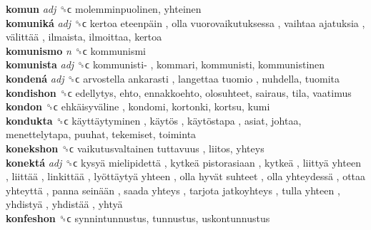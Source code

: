 \textbf{komun} \emph{adj}  ␝ϲ  molemminpuolinen, yhteinen  \\
\textbf{komuniká} \emph{adj}  ␝ϲ   kertoa eteenpäin ,  olla vuorovaikutuksessa ,  vaihtaa ajatuksia ,  välittää , ilmaista, ilmoittaa, kertoa  \\
\textbf{komunismo} \emph{n}  ␝ϲ  kommunismi  \\
\textbf{komunista} \emph{adj}  ␝ϲ   kommunisti- , kommari, kommunisti, kommunistinen  \\
\textbf{kondená} \emph{adj}  ␝ϲ   arvostella ankarasti ,  langettaa tuomio , nuhdella, tuomita  \\
\textbf{kondishon} ␝ϲ  edellytys, ehto, ennakkoehto, olosuhteet, sairaus, tila, vaatimus  \\
\textbf{kondon} ␝ϲ   ehkäisyväline , kondomi, kortonki, kortsu, kumi  \\
\textbf{kondukta} ␝ϲ   käyttäytyminen ,  käytös ,  käytöstapa , asiat, johtaa, menettelytapa, puuhat, tekemiset, toiminta  \\
\textbf{konekshon} ␝ϲ   vaikutusvaltainen tuttavuus , liitos, yhteys  \\
\textbf{konektá} \emph{adj}  ␝ϲ   kysyä mielipidettä ,  kytkeä pistorasiaan ,  kytkeä ,  liittyä yhteen ,  liittää ,  linkittää ,  lyöttäytyä yhteen ,  olla hyvät suhteet ,  olla yhteydessä ,  ottaa yhteyttä ,  panna seinään ,  saada yhteys ,  tarjota jatkoyhteys ,  tulla yhteen ,  yhdistyä ,  yhdistää ,  yhtyä   \\
\textbf{konfeshon} ␝ϲ  synnintunnustus, tunnustus, uskontunnustus  \\
